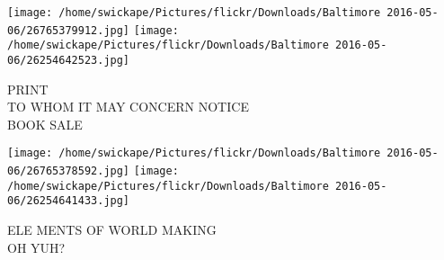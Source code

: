 \documentclass[10pt,letterpaper]{article}
\begin{document}
\vspace{0.25in}
\texttt{[image: /home/swickape/Pictures/flickr/Downloads/Baltimore 2016-05-06/26765379912.jpg]}
\texttt{[image: /home/swickape/Pictures/flickr/Downloads/Baltimore 2016-05-06/26254642523.jpg]}

PRINT\\
TO WHOM IT MAY CONCERN NOTICE\\
BOOK SALE
\pagebreak

\texttt{[image: /home/swickape/Pictures/flickr/Downloads/Baltimore 2016-05-06/26765378592.jpg]}
\texttt{[image: /home/swickape/Pictures/flickr/Downloads/Baltimore 2016-05-06/26254641433.jpg]}

ELE MENTS OF WORLD MAKING\\
OH YUH?
\pagebreak
\end{document}
